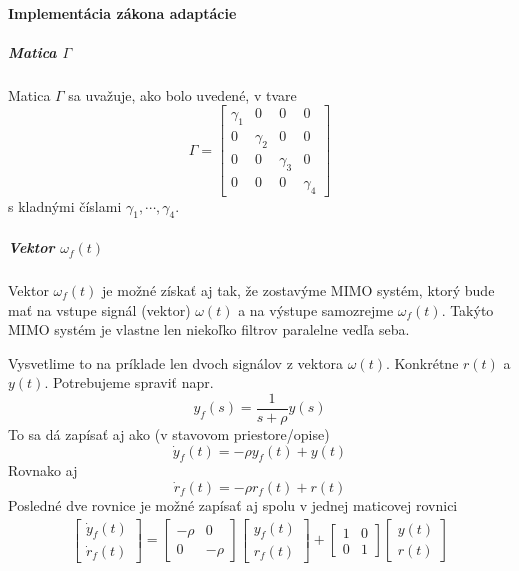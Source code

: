 \documentclass[a4paper, 10pt, ]{article}
\begin{document}
\paragraph{Implementácia zákona adaptácie}


\subparagraph{Matica $\Gamma$}
Matica $\Gamma$ sa uvažuje, ako bolo uvedené, v tvare
\begin{equation}
    \Gamma =
    \begin{bmatrix}
        \gamma_1 & 0 & 0 & 0 \\
        0 & \gamma_2 & 0 & 0 \\
        0 & 0 & \gamma_3 & 0 \\
        0 & 0 & 0 & \gamma_4
    \end{bmatrix}
\end{equation}
s kladnými číslami $\gamma_1, \cdots, \gamma_4$.



\subparagraph{Vektor $\omega_f(t)$}

Vektor $\omega_f(t)$ je možné získať aj tak, že zostavýme MIMO systém, ktorý bude mať na vstupe signál (vektor) $\omega(t)$ a na výstupe samozrejme $\omega_f(t)$. Takýto MIMO systém je vlastne len niekoľko filtrov paralelne vedľa seba.

Vysvetlime to na príklade len dvoch signálov z vektora $\omega(t)$. Konkrétne $r(t)$ a $y(t)$. Potrebujeme spraviť napr.
\begin{equation}
    y_f(s) = \frac{1}{s+\rho} y(s)
\end{equation}
To sa dá zapísať aj ako (v stavovom priestore/opise)
\begin{equation}
    \dot y_f(t) = -\rho y_f(t) + y(t)
\end{equation}
Rovnako aj
\begin{equation}
    \dot r_f(t) = -\rho r_f(t) + r(t)
\end{equation}
Posledné dve rovnice je možné zapísať aj spolu v jednej maticovej rovnici
\begin{align}
    \begin{bmatrix}
        \dot y_f(t) \\ \dot r_f(t)
    \end{bmatrix}
    =
    \begin{bmatrix}
        -\rho & 0 \\ 0 & -\rho
    \end{bmatrix}
    \begin{bmatrix}
         y_f(t) \\  r_f(t)
    \end{bmatrix}
    +
    \begin{bmatrix}
        1 & 0 \\ 0 & 1
    \end{bmatrix}
    \begin{bmatrix}
         y(t) \\  r(t)
    \end{bmatrix}
\end{align}
\end{document}
